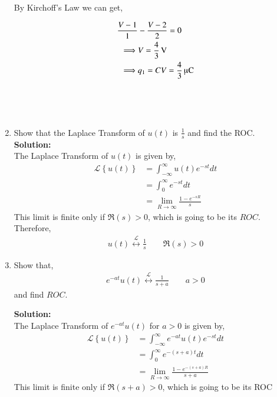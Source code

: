 \documentclass[journal,12pt,twocolumn]{IEEEtran}
\newcommand{\solution}{\noindent \textbf{Solution: }}
\providecommand{\cbrak}[1]{\ensuremath{\left\{#1\right\}}}
\providecommand{\system}[1]{\overset{\mathcal{#1}}{ \longleftrightarrow}}
\numberwithin{equation}{section}
\numberwithin{figure}{section}
\renewcommand\thesection{\arabic{section}}
\begin{document}
\begin{enumerate}[label=\thesection.\arabic*,ref=\thesection.\theenumi]
			By Kirchoff's Law we can get,

			\begin{align}
				\frac{V-1}{1} & - \frac{V-2}{2} = 0\\
				\implies & V = \SI[parse-numbers=false]{\frac{4}{3}}{\volt}\\
				\implies & q_1 = CV = \SI[parse-numbers=false]{\frac{4}{3}}{\micro\coulomb}
			\end{align}\ \\ \ \\ \ \\

		\item Show that the Laplace Transform of $u(t)$ is $\frac{1}{s}$ and find the ROC.\\

		\solution\\
			The Laplace Transform of $u(t)$ is given by,
			\begin{align}
				\mathcal{L}\cbrak{u(t)} & = \int_{-\infty}^\infty u(t) e^{-st} dt \\
							& = \int_0^\infty e^{-st} dt\\
							& = \lim_{R \to \infty} \frac{1-e^{-sR}}{s}
			\end{align}
			This limit is finite only if $\Re(s) > 0$, which is going to be its $ROC$.\\

			Therefore, 
			\begin{align}
				u(t) \system{L} \frac{1}{s} \qquad \Re(s) > 0 
			\end{align}

		\item Show that,
			\begin{align}
				e^{-at}u(t) \system{L} \frac{1}{s+a} \qquad a > 0
			\end{align}
			and find $ROC$.

		\solution\\
			The Laplace Transform of $e^{-at}u(t)$ for $a > 0$ is given by,
			\begin{align}
				\mathcal{L}\cbrak{u(t)} & = \int_{-\infty}^\infty e^{-at} u(t) e^{-st} dt \\
							& = \int_0^\infty e^{-(s+a)t} dt\\
							& = \lim_{R \to \infty} \frac{1-e^{-(s+a)R}}{s+a}
			\end{align}
			This limit is finite only if $\Re(s+a)>0$, which is going to be its ROC


\end{enumerate}
\end{document}
